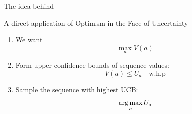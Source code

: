 \documentclass{beamer}
\begin{document}
    


\begin{frame}{The idea behind \OLOP}
\begin{block}{A direct application of Optimism in the Face of Uncertainty}
\begin{enumerate}
    \item We want \[\max_a V(a)\] \pause
    \item Form {upper confidence-bounds} of sequence values: \[ V(a) \leq U_a \quad \text{w.h.p}\] \pause
    \item Sample the sequence with highest UCB: \[\operatorname*{arg\,max}_a U_a\]
\end{enumerate}
\end{block}
\end{frame}
\end{document}
